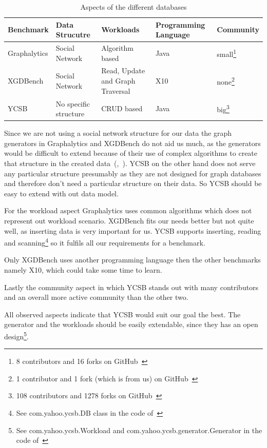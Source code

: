 \begin{table}[!h]
  \caption{Aspects of the different databases}
  \label{tab:benchmarkComparison}
  \begin{minipage}{\textwidth}
    \begin{tabularx}{\textwidth}{ | l | X | X | X | l | }
      \hline
      Benchmark & Data Strucutre & Workloads & Programming Language & Community \\ \hline
      Graphalytics & Social Network & Algorithm based & Java & small\footnote{8 contributors and 16 forks on GitHub~\cite{LDBC}} \\ \hline
      XGDBench & Social Network & Read, Update and Graph Traversal & X10 & none\footnote{1 contributor and 1 fork (which is from us) on GitHub~\cite{Miyurud}} \\ \hline
      YCSB & No specific structure & CRUD based & Java & big\footnote{108 contributors and 1278 forks on GitHub~\cite{Cooper}} \\
      \hline
    \end{tabularx}
  \end{minipage}
\end{table}

Since we are not using a social network structure for our data the graph generators in Graphalytics and XGDBench do not aid us much,
as the generators would be difficult to extend because of their use of complex algorithms to create that structure in the created data~(\cite{Erling2015},~\cite{Dayarathna2012}).
YCSB on the other hand does not serve any particular structure presumably as they are not designed for graph databases and therefore don't need a particular structure on their data.
So YCSB should be easy to extend with out data model.

For the workload aspect Graphalytics uses common algorithms which does not represent out workload scenario.
XGDBench fits our needs better but not quite well, as inserting data is very important for us.
YCSB supports inserting, reading and scanning\footnote{See com.yahoo.ycsb.DB class in the code of~\cite{Cooper}} so it fulfils all our requirements for a benchmark.

Only XGDBench uses another programming language then the other benchmarks namely X10,
which could take some time to learn.

Lastly the community aspect in which YCSB stands out with many contributors and an overall more active community than the other two.

All observed aspects indicate that YCSB would suit our goal the best.
The generator and the workloads should be easily extendable, since they has an open design\footnote{See com.yahoo.ycsb.Workload and com.yahoo.ycsb.generator.Generator in the code of~\cite{Cooper}}.

